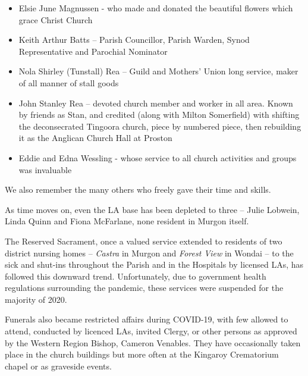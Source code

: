 \begin{itemize}

\item

  Elsie June Magnussen - who made and donated the beautiful flowers which grace Christ Church

\item

  Keith Arthur Batts -- Parish Councillor, Parish Warden, Synod Representative and Parochial Nominator

\item

  Nola Shirley (Tunstall) Rea -- Guild and Mothers' Union long service, maker of all manner of stall goods

\item

  John Stanley Rea -- devoted church member and worker in all area. Known by friends as Stan, and credited (along with Milton Somerfield) with shifting the deconsecrated Tingoora church, piece by numbered piece, then rebuilding it as the Anglican Church Hall at Proston

\item

  Eddie and Edna Wessling - whose service to all church activities and groups was invaluable

\end{itemize}



We also remember the many others who freely gave their time and skills.



\balance


As time moves on, even the LA base has been depleted to three -- Julie Lobwein, Linda Quinn and Fiona McFarlane, none resident in Murgon itself.



The Reserved Sacrament, once a valued service extended to residents of two district nursing homes -- \emph{Castra} in Murgon and \emph{Forest View} in Wondai -- to the sick and shut-ins throughout the Parish and in the Hospitals by licensed LAs, has followed this downward trend. Unfortunately, due to government health regulations surrounding the pandemic, these services were suspended for the majority of 2020.



Funerals also became restricted affairs during COVID-19, with few allowed to attend, conducted by licenced LAs, invited Clergy, or other persons as approved by the Western Region Bishop, Cameron Venables. They have occasionally taken place in the church buildings but more often at the Kingaroy Crematorium chapel or as graveside events.




